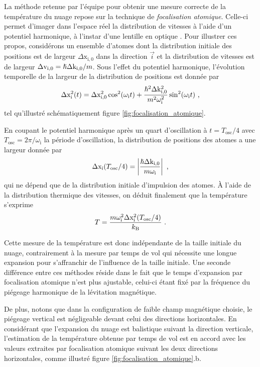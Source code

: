 La méthode retenue par l'équipe pour obtenir une mesure correcte de la température du nuage repose sur la technique de \emph{focalisation atomique}. Celle-ci permet d'imager dans l'espace réel la distribution de vitesses à l'aide d'un potentiel harmonique, à l'instar d'une lentille en optique \citep{murthy2014matter}. Pour illustrer ces propos, considérons un ensemble d'atomes dont la distribution initiale des positions est de largeur $\Delta\mathrm{x}_{\mathrm{i,0}}$ dans la direction $\vec{i}$ et la distribution de vitesses est de largeur $\Delta\mathrm{v}_{\mathrm{i,0}}=\hslash \Delta\mathrm{k}_{\mathrm{i,0}} /m$. Sous l'effet du potentiel harmonique, l'évolution temporelle de la largeur de la distribution de positions est donnée par
\begin{equation}
\Delta\mathrm{x}_{\mathrm{i}}^2(t)=\Delta\mathrm{x}_{\mathrm{i,0}}^2 \cos^2(\omega_{\mathrm{i}} t) + \frac{\hslash^2 \Delta\mathrm{k}_{\mathrm{i,0}}^2}{m^2 \omega_{\mathrm{i}}^2} \sin^2(\omega_{\mathrm{i}} t) \text{ ,}
\end{equation}
tel qu'illustré schématiquement figure \ref{fig:focalisation_atomique}.

En coupant le potentiel harmonique après un quart d'oscillation à $t=T_{\mathrm{osc}}/4$ avec $T_{\mathrm{osc}}= 2\pi/\omega_{\mathrm{i}}$ la période d'oscillation, la distribution de positions des atomes a une largeur donnée par
\begin{equation}
\Delta\mathrm{x}_{\mathrm{i}}(T_{\mathrm{osc}}/4)=\left|\frac{\hslash \Delta\mathrm{k}_{\mathrm{i,0}}}{m \omega_{\mathrm{i}}}\right| \text{ ,}
\end{equation}
qui ne dépend que de la distribution initiale d'impulsion des atomes. À l'aide de la distribution thermique des vitesses, on déduit finalement que la température s'exprime
\begin{equation}
T=\frac{m \omega_{\mathrm{i}}^2 \Delta \mathrm{x}_{\mathrm{i}}^2(T_{\mathrm{osc}}/4)}{k_{\mathrm{B}}} \text{ .}
\end{equation}

Cette mesure de la température est donc indépendante de la taille initiale du nuage, contrairement à la mesure par temps de vol qui nécessite une longue expansion pour s'affranchir de l'influence de la taille initiale. Une seconde différence entre ces méthodes réside dans le fait que le temps d'expansion par focalisation atomique n'est plus ajustable, celui-ci étant fixé par la fréquence du piégeage harmonique de la lévitation magnétique. 

De plus, notons que dans la configuration de faible champ magnétique choisie, le piégeage vertical est négligeable devant celui des directions horizontales. En considérant que l'expansion du nuage est balistique suivant la direction verticale, l'estimation de la température obtenue par temps de vol est en accord avec les valeurs extraites par focalisation atomique suivant les deux directions horizontales, comme illustré figure \ref{fig:focalisation_atomique}.b.

